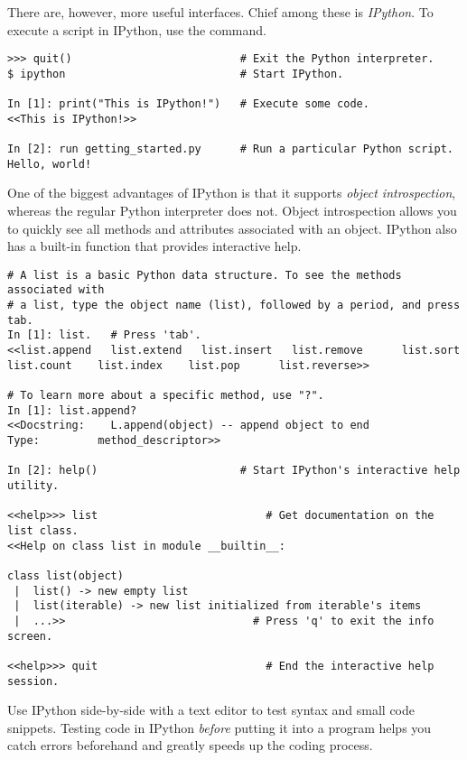There are, however, more useful interfaces.
Chief among these is \emph{IPython}.
To execute a script in IPython, use the  command.

\begin{lstlisting}
>>> quit()                          # Exit the Python interpreter.
$ ipython                           # Start IPython.

In [1]: print("This is IPython!")   # Execute some code.
<<This is IPython!>>

In [2]: run getting_started.py      # Run a particular Python script.
Hello, world!
\end{lstlisting}

One of the biggest advantages of IPython is that it supports \emph{object introspection}, whereas the regular Python interpreter does not.
Object introspection allows you to quickly see all methods and attributes associated with an object.
IPython also has a built-in  function that provides interactive help.

\begin{lstlisting}
# A list is a basic Python data structure. To see the methods associated with
# a list, type the object name (list), followed by a period, and press tab.
In [1]: list.   # Press 'tab'.
<<list.append   list.extend   list.insert   list.remove      list.sort
list.count    list.index    list.pop      list.reverse>>

# To learn more about a specific method, use "?".
In [1]: list.append?
<<Docstring:    L.append(object) -- append object to end
Type:         method_descriptor>>

In [2]: help()                      # Start IPython's interactive help utility.

<<help>>> list                          # Get documentation on the list class.
<<Help on class list in module __builtin__:

class list(object)
 |  list() -> new empty list
 |  list(iterable) -> new list initialized from iterable's items
 |  ...>>                             # Press 'q' to exit the info screen.

<<help>>> quit                          # End the interactive help session.
\end{lstlisting}

Use IPython side-by-side with a text editor to test syntax and small code snippets.
Testing code in IPython \emph{before} putting it into a program helps you catch errors beforehand and greatly speeds up the coding process.

